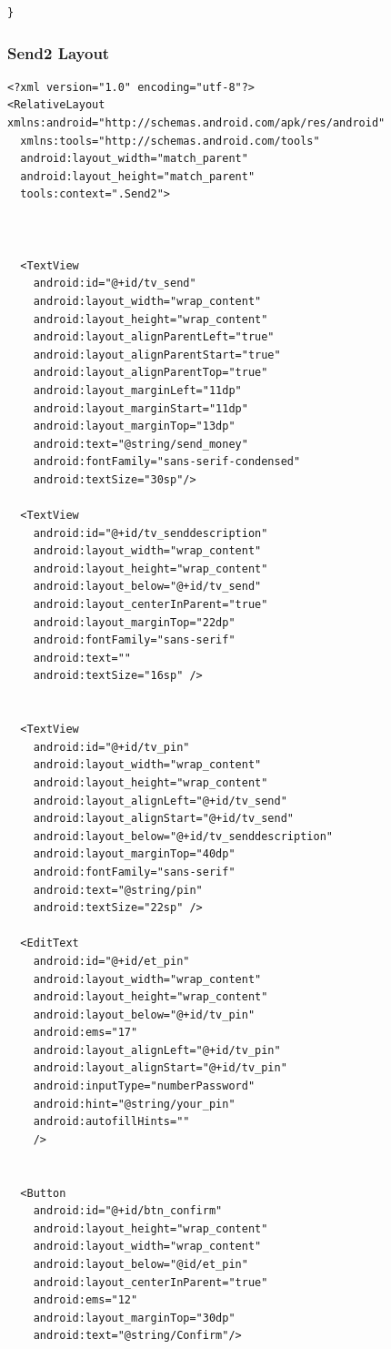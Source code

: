 \documentclass[11pt, a4paper]{article}
\begin{document}
\begin{appendices}
\begin{lstlisting}
}
\end{lstlisting}
\subsubsection{Send2 Layout}
\begin{lstlisting}
<?xml version="1.0" encoding="utf-8"?>
<RelativeLayout xmlns:android="http://schemas.android.com/apk/res/android"
  xmlns:tools="http://schemas.android.com/tools"
  android:layout_width="match_parent"
  android:layout_height="match_parent"
  tools:context=".Send2">



  <TextView
    android:id="@+id/tv_send"
    android:layout_width="wrap_content"
    android:layout_height="wrap_content"
    android:layout_alignParentLeft="true"
    android:layout_alignParentStart="true"
    android:layout_alignParentTop="true"
    android:layout_marginLeft="11dp"
    android:layout_marginStart="11dp"
    android:layout_marginTop="13dp"
    android:text="@string/send_money"
    android:fontFamily="sans-serif-condensed"
    android:textSize="30sp"/>

  <TextView
    android:id="@+id/tv_senddescription"
    android:layout_width="wrap_content"
    android:layout_height="wrap_content"
    android:layout_below="@+id/tv_send"
    android:layout_centerInParent="true"
    android:layout_marginTop="22dp"
    android:fontFamily="sans-serif"
    android:text=""
    android:textSize="16sp" />


  <TextView
    android:id="@+id/tv_pin"
    android:layout_width="wrap_content"
    android:layout_height="wrap_content"
    android:layout_alignLeft="@+id/tv_send"
    android:layout_alignStart="@+id/tv_send"
    android:layout_below="@+id/tv_senddescription"
    android:layout_marginTop="40dp"
    android:fontFamily="sans-serif"
    android:text="@string/pin"
    android:textSize="22sp" />

  <EditText
    android:id="@+id/et_pin"
    android:layout_width="wrap_content"
    android:layout_height="wrap_content"
    android:layout_below="@+id/tv_pin"
    android:ems="17"
    android:layout_alignLeft="@+id/tv_pin"
    android:layout_alignStart="@+id/tv_pin"
    android:inputType="numberPassword"
    android:hint="@string/your_pin"
    android:autofillHints=""
    />


  <Button
    android:id="@+id/btn_confirm"
    android:layout_height="wrap_content"
    android:layout_width="wrap_content"
    android:layout_below="@id/et_pin"
    android:layout_centerInParent="true"
    android:ems="12"
    android:layout_marginTop="30dp"
    android:text="@string/Confirm"/>



\end{lstlisting}
\end{appendices}
\end{document}
